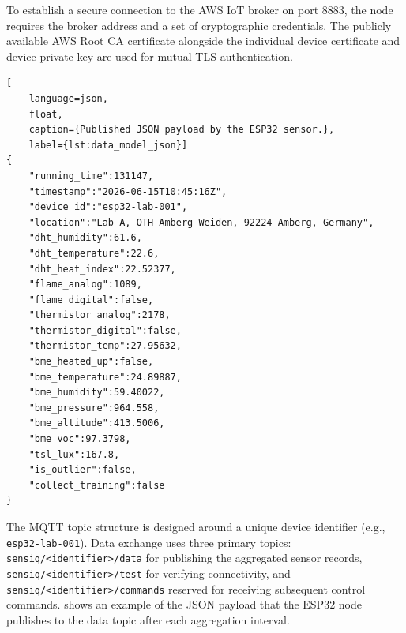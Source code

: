 To establish a secure connection to the AWS IoT broker on port 8883,
the node requires the broker address and a set of cryptographic credentials.
The publicly available AWS Root CA certificate alongside the individual
device certificate and device private key are used for mutual TLS authentication.

\begin{lstlisting}[
    language=json, 
    float, 
    caption={Published JSON payload by the ESP32 sensor.}, 
    label={lst:data_model_json}]
{
    "running_time":131147,
    "timestamp":"2026-06-15T10:45:16Z",
    "device_id":"esp32-lab-001",
    "location":"Lab A, OTH Amberg-Weiden, 92224 Amberg, Germany",
    "dht_humidity":61.6,
    "dht_temperature":22.6,
    "dht_heat_index":22.52377,
    "flame_analog":1089,
    "flame_digital":false,
    "thermistor_analog":2178,
    "thermistor_digital":false,
    "thermistor_temp":27.95632,
    "bme_heated_up":false,
    "bme_temperature":24.89887,
    "bme_humidity":59.40022,
    "bme_pressure":964.558,
    "bme_altitude":413.5006,
    "bme_voc":97.3798,
    "tsl_lux":167.8,
    "is_outlier":false,
    "collect_training":false
}
\end{lstlisting}

The MQTT topic structure is designed around a unique device identifier
(e.g., \texttt{esp32-lab-001}).
Data exchange uses three primary topics:
\texttt{sensiq/<identifier>/data} for publishing the aggregated sensor records,
\texttt{sensiq/<identifier>/test} for verifying connectivity, and
\texttt{sensiq/<identifier>/commands} reserved for receiving subsequent control commands.
 shows an example of the JSON payload that the ESP32
node publishes to the data topic after each aggregation interval.
